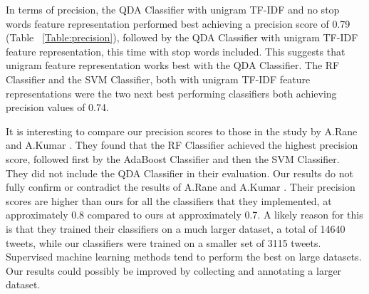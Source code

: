 In terms of precision, the QDA Classifier with unigram TF-IDF and no stop words feature representation performed best achieving a precision score of 0.79 (Table ~\ref{Table:precision}), followed by the QDA Classifier with unigram TF-IDF feature representation, this time with stop words included. This suggests that unigram feature representation works best with the QDA Classifier. The RF Classifier and the SVM Classifier, both with unigram TF-IDF feature representations were the two next best performing classifiers both achieving precision values of 0.74.

It is interesting to compare our precision scores to those in the study by A.Rane and A.Kumar \cite{Rane2018}. They found that the RF Classifier achieved the highest precision score, followed first by the AdaBoost Classifier and then the SVM Classifier. They did not include the QDA Classifier in their evaluation. Our results do not fully confirm or contradict the results of A.Rane and A.Kumar \cite{Rane2018}. Their precision scores are higher than ours for all the classifiers that they implemented, at approximately 0.8 compared to ours at approximately 0.7. A likely reason for this is that they trained their classifiers on a much larger dataset, a total of 14640 tweets, while our classifiers were trained on a smaller set of 3115 tweets. Supervised machine learning methods tend to perform the best on large datasets. Our results could possibly be improved by collecting and annotating a larger dataset.

